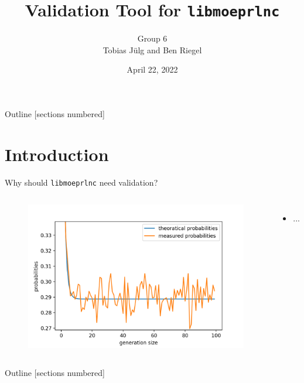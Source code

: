 \documentclass[t]{beamer} %
\title{Validation Tool for \texttt{libmoeprlnc}}
\date{April 22, 2022}
\author{Group 6\\Tobias Jülg and Ben Riegel}
\institute[TUM]{Technical University of Munich}
\begin{document}
\maketitle




\begin{frame}{Outline}
  [sections numbered]
  \tableofcontents %
\end{frame}


\section{Introduction}
\begin{frame}{Why should \texttt{libmoeprlnc} need validation?}
  \begin{columns}
    \begin{figure}[htb]
      \centering
      \includegraphics[scale=0.16]{figures/gf2}
    \end{figure}
  \begin{itemize}
    \item ...
  \end{itemize}
  \end{columns}
\end{frame}

\begin{frame}{Outline}
  [sections numbered]
  \tableofcontents %
\end{frame}


\end{document}
